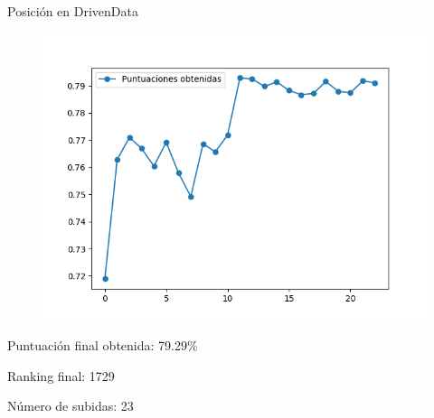 \begin{frame}{Posición en DrivenData}

	\begin{figure}[H]
		\centering
		\includegraphics[scale=0.45]{./figures/knn/scores.png}
	\end{figure}

	\centering
	Puntuación final obtenida: 79.29\%
	
	Ranking final: 1729
	
	Número de subidas: 23
    
\end{frame}

